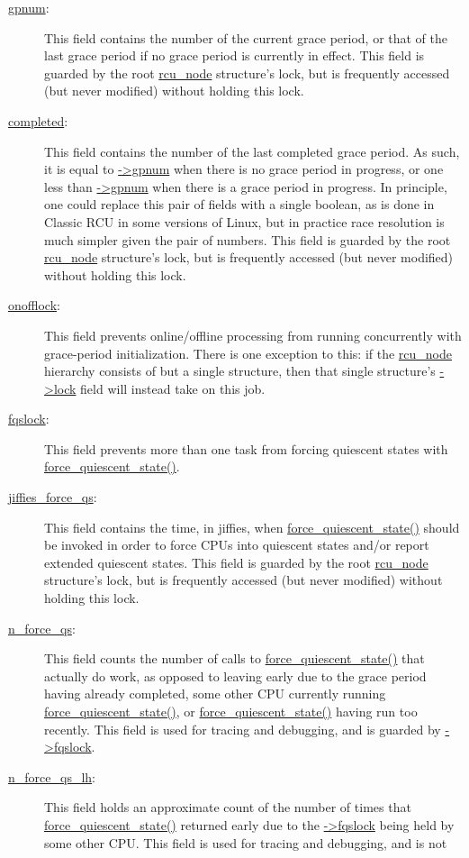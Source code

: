 \begin{description}
\item[\url{gpnum}:]
	This field contains the number of the current grace period,
	or that of the last grace period if no grace period is currently
	in effect.
	This field is guarded by the root \url{rcu_node} structure's lock,
	but is frequently accessed (but never modified) without holding
	this lock.
\item[\url{completed}:]
	This field contains the number of the last completed grace period.
	As such, it is equal to \url{->gpnum} when there is no grace period
	in progress, or one less than \url{->gpnum} when there is a
	grace period in progress.
	In principle, one could replace this pair of fields with a single
	boolean, as is done in Classic RCU in some versions of Linux,
	but in practice race resolution is much simpler given the pair
	of numbers.
	This field is guarded by the root \url{rcu_node} structure's lock,
	but is frequently accessed (but never modified) without holding
	this lock.
\item[\url{onofflock}:]
	This field prevents online/offline processing from running
	concurrently with grace-period initialization.
	There is one exception to this: if the \url{rcu_node}
	hierarchy consists of but a single structure, then
	that single structure's \url{->lock} field will instead take on
	this job.
\item[\url{fqslock}:]
	This field prevents more than one task from forcing quiescent
	states with \url{force_quiescent_state()}.
\item[\url{jiffies_force_qs}:]
	This field contains the time, in jiffies, when
	\url{force_quiescent_state()} should be invoked in order to
	force CPUs into quiescent states and/or report extended
	quiescent states.
	This field is guarded by the root \url{rcu_node} structure's lock,
	but is frequently accessed (but never modified) without holding
	this lock.
\item[\url{n_force_qs}:]
	This field counts the number of calls to \url{force_quiescent_state()}
	that actually do work, as opposed to leaving early due to
	the grace period having already completed, some other
	CPU currently running \url{force_quiescent_state()},
	or \url{force_quiescent_state()} having run too recently.
	This field is used for tracing and debugging, and
	is guarded by \url{->fqslock}.
\item[\url{n_force_qs_lh}:]
	This field holds an approximate count of the number of times that
	\url{force_quiescent_state()} returned early due to the
	\url{->fqslock} being held by some other CPU.
	This field is used for tracing and debugging, and is not

\end{description}
